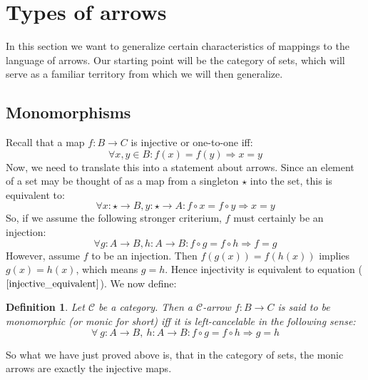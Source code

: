 \documentclass[12pt, a4paper]{article}
\newtheorem{definition}{Definition}[section]
\numberwithin{equation}{section}
\begin{document}
\section{Types of arrows}
In this section we want to generalize certain characteristics of mappings to the language of arrows. Our starting point will be the category of sets, which will serve as a familiar territory from which we will then generalize.

\subsection{Monomorphisms}
Recall that a map $f:B\rightarrow C$ is injective or one-to-one iff:
\begin{equation}
\forall x, y\in B: f(x)=f(y)\Rightarrow x=y
\end{equation}
Now, we need to translate this into a statement about arrows. Since an element of a set may be thought of as a map from a singleton $\star$ into the set, this is equivalent to:
\begin{equation}
\forall x:\star\rightarrow B, y:\star\rightarrow A:f\circ x=f\circ y\Rightarrow x=y
\end{equation}
So, if we assume the following stronger criterium, $f$ must certainly be an injection:
\begin{equation}
\label{injective_equivalent}
\forall g:A\rightarrow B, h:A\rightarrow B: f\circ g=f\circ h\Rightarrow f=g
\end{equation}
However, assume $f$ to be an injection. Then $f(g(x))=f(h(x))$ implies $g(x)=h(x)$, which means $g=h$. Hence injectivity is equivalent to equation ($\ref{injective_equivalent}$). We now define:

\begin{definition}
Let $\mathcal{C}$ be a category. Then a $\mathcal{C}$-arrow $f: B\rightarrow C$ is said to be monomorphic (or monic for short) iff it is left-cancelable in the following sense:
\begin{equation}
\forall\ g:A\rightarrow B,\ h:A\rightarrow B: f\circ g=f\circ h\Rightarrow g=h  
\end{equation}
\end{definition}

So what we have just proved above is, that in the category of sets, the monic arrows are exactly the injective maps.
\end{document}
